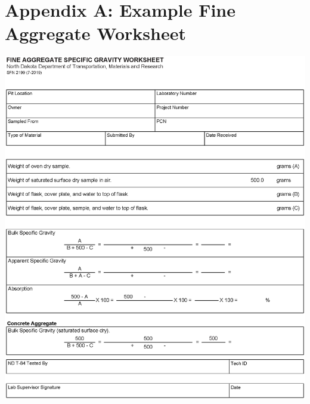 \documentclass[12pt]{article}
\begin{document}
\pagebreak

\section*{Appendix A: Example Fine Aggregate Worksheet}
\label{AppendixA}
\begin{center}
    \includegraphics[width=1\linewidth]{NDDOT_Fine_Agg.eps}
\end{center}

\pagebreak
\end{document}

